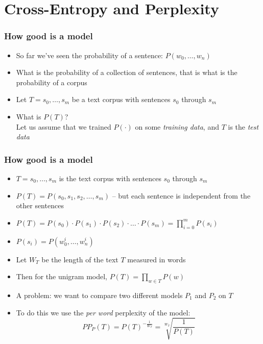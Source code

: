 \section{Cross-Entropy and Perplexity}
\frame{\tableofcontents[currentsection]}

\begin{frame}
\frametitle{How good is a model}
\begin{itemize}[<+->]
\item So far we've seen the probability of a sentence: $P(w_0, \ldots, w_n)$
\item What is the probability of a collection of sentences, that is what is the probability of a corpus
\item Let $T = s_0, \ldots, s_m$ be a text corpus with sentences $s_0$ through $s_m$
\item What is $P(T)$? \\
Let us assume that we trained $P(\cdot)$ on some {\em training data}, and $T$ is the {\em test data}
\end{itemize}
\end{frame}

\begin{frame}
\frametitle{How good is a model}
\begin{itemize}[<+->]
\item $T = s_0, \ldots, s_m$ is the text corpus with sentences $s_0$ through $s_m$
\item $P(T) = P(s_0, s_1, s_2, \ldots, s_m)$ -- but each sentence is independent from the other sentences
\item $P(T) = P(s_0) \cdot P(s_1) \cdot P(s_2) \cdot \ldots \cdot P(s_m) = \prod_{i=0}^m P(s_i)$ 
\item $P(s_i) = P(w_0^i, \ldots, w_n^i)$ 
\item Let $W_T$ be the length of the text $T$ measured in words
\item Then for the unigram model, $P(T) = \prod_{w \in T} P(w)$
\item A problem: we want to compare two different models $P_1$ and $P_2$ on $T$
\item To do this we use the {\em per word} perplexity of the model:
\[ \textit{PP}_P(T) = P(T)^{- \frac{1}{W_T}} = \sqrt[W_T]{\frac{1}{P(T)}} \]
\end{itemize}
\end{frame}

